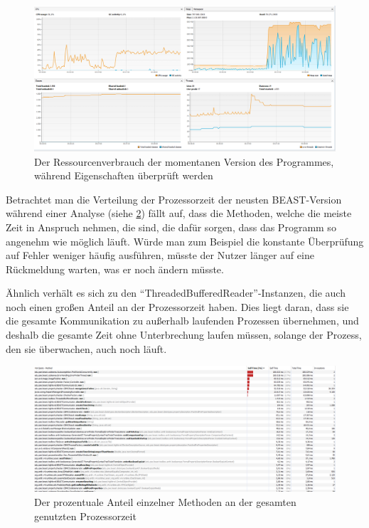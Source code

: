 \documentclass[a4paper]{scrreprt}
\begin{document}
\vspace{4cm}

\begin{figure}[ht]
	\centering
  \includegraphics[width=1.0\textwidth,
  height=0.40\textwidth]{images/NEW_YES.png} \caption{Der Ressourcenverbrauch der
  momentanen Version des Programmes, während Eigenschaften überprüft werden}
	\label{fig4}
\end{figure}

\newpage
Betrachtet man die Verteilung der Prozessorzeit der neusten BEAST-Version während einer
Analyse (siehe \ref{fig5}) fällt auf, dass die Methoden, welche die meiste
Zeit in Anspruch nehmen, die sind, die dafür sorgen, dass das Programm
so angenehm wie möglich läuft. Würde man zum Beispiel die konstante
Überprüfung auf Fehler weniger häufig ausführen, müsste der Nutzer länger auf eine
Rückmeldung warten, was er noch ändern müsste. 

Ähnlich verhält es sich zu den
"`ThreadedBufferedReader"'-Instanzen, die auch noch einen großen Anteil an der
Prozessorzeit haben. Dies liegt daran, dass sie die gesamte Kommunikation zu
außerhalb laufenden Prozessen übernehmen, und deshalb die gesamte Zeit ohne
Unterbrechung laufen müssen, solange der Prozess, den sie überwachen, auch noch
läuft.

\begin{figure}[ht]
	\centering
  \includegraphics[width=1.0\textwidth,
  height=0.40\textwidth]{images/BEAST_PROCESSORTIME.png} \caption{Der
  prozentuale Anteil einzelner Methoden an der gesamten genutzten Prozessorzeit}
	\label{fig5}
\end{figure}
\end{document}
